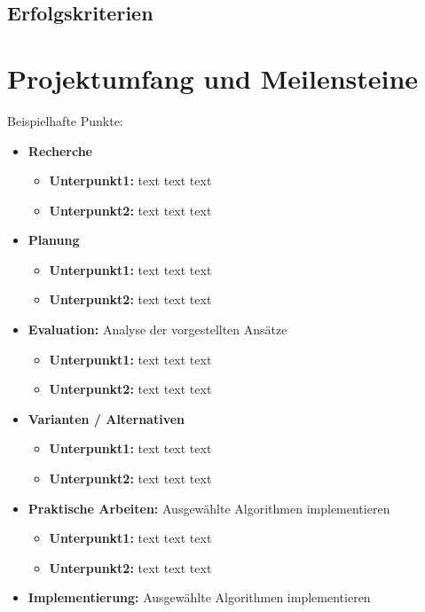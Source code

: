 \documentclass[lang=ngerman,inputenc=utf8,fontsize=10pt]{ldvarticle}
\begin{document}
\subsection*{Erfolgskriterien}

\section{Projektumfang und Meilensteine}

Beispielhafte Punkte:

\begin{itemize}
	\item \textbf{Recherche}
		\begin{itemize}
			\item \textbf{Unterpunkt1:} text text text
			\item \textbf{Unterpunkt2:} text text text
		\end{itemize}
	\item \textbf{Planung}
		\begin{itemize}
			\item \textbf{Unterpunkt1:} text text text
			\item \textbf{Unterpunkt2:} text text text
		\end{itemize}
	\item \textbf{Evaluation:} Analyse der vorgestellten Ansätze
		\begin{itemize}
			\item \textbf{Unterpunkt1:} text text text
			\item \textbf{Unterpunkt2:} text text text
		\end{itemize}
	\item \textbf{Varianten / Alternativen}  
		\begin{itemize}
			\item \textbf{Unterpunkt1:} text text text
			\item \textbf{Unterpunkt2:} text text text
		\end{itemize}
	\item \textbf{Praktische Arbeiten:} Ausgewählte Algorithmen implementieren 
		\begin{itemize}
			\item \textbf{Unterpunkt1:} text text text
			\item \textbf{Unterpunkt2:} text text text 
		\end{itemize}
	\item \textbf{Implementierung:} Ausgewählte Algorithmen implementieren 
		\begin{itemize}

\end{itemize}
\end{itemize}
\end{document}
